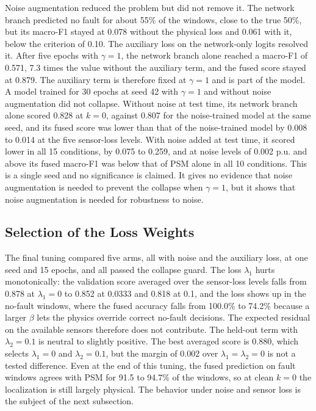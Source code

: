 \documentclass[MTech]{ugthesis}
\begin{document}
Noise augmentation reduced the problem but did not remove it. The network branch predicted no fault for about 55\% of the windows, close to the true 50\%, but its macro-F1 stayed at 0.078 without the physical loss and 0.061 with it, below the criterion of 0.10. The auxiliary loss on the network-only logits resolved it. After five epochs with $\gamma=1$, the network branch alone reached a macro-F1 of 0.571, 7.3 times the value without the auxiliary term, and the fused score stayed at 0.879. The auxiliary term is therefore fixed at $\gamma=1$ and is part of the model. A model trained for 30 epochs at seed 42 with $\gamma=1$ and without noise augmentation did not collapse. Without noise at test time, its network branch alone scored 0.828 at $k=0$, against 0.807 for the noise-trained model at the same seed, and its fused score was lower than that of the noise-trained model by 0.008 to 0.014 at the five sensor-loss levels. With noise added at test time, it scored lower in all 15 conditions, by 0.075 to 0.259, and at noise levels of 0.002 p.u. and above its fused macro-F1 was below that of \ac{PSM} alone in all 10 conditions. This is a single seed and no significance is claimed. It gives no evidence that noise augmentation is needed to prevent the collapse when $\gamma=1$, but it shows that noise augmentation is needed for robustness to noise.

\subsection{Selection of the Loss Weights}

The final tuning compared five arms, all with noise and the auxiliary loss, at one seed and 15 epochs, and all passed the collapse guard. The loss $\lambda_1$ hurts monotonically: the validation score averaged over the sensor-loss levels falls from 0.878 at $\lambda_1=0$ to 0.852 at 0.0333 and 0.818 at 0.1, and the loss shows up in the no-fault windows, where the fused accuracy falls from 100.0\% to 74.2\% because a larger $\beta$ lets the physics override correct no-fault decisions. The expected residual on the available sensors therefore does not contribute. The held-out term with $\lambda_2=0.1$ is neutral to slightly positive. The best averaged score is 0.880, which selects $\lambda_1=0$ and $\lambda_2=0.1$, but the margin of 0.002 over $\lambda_1=\lambda_2=0$ is not a tested difference. Even at the end of this tuning, the fused prediction on fault windows agrees with \ac{PSM} for 91.5 to 94.7\% of the windows, so at clean $k=0$ the localization is still largely physical. The behavior under noise and sensor loss is the subject of the next subsection.
\end{document}
